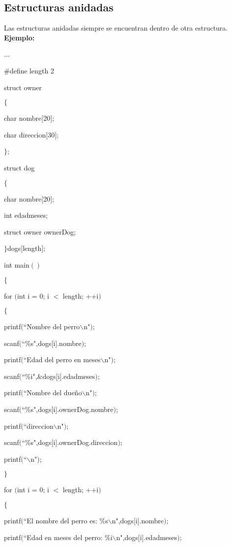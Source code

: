 \documentclass[]{article}
\begin{document}
	\subsection{Estructuras anidadas}
	Las estructuras anidadas siempre se encuentran dentro de otra estructura.\\
	
	\textbf{Ejemplo:\\}
	
	...
	
	\#define length 2
	
	struct owner
	
	$\lbrace$
	
	char nombre$[$20$]$;
	
	char direccion$[$30$]$;
	
	$\rbrace$;
	
	struct dog
	
	$\lbrace$
	
	char nombre$[$20$]$;
	
	int edadmeses;
	
	struct owner ownerDog;
	
	$\rbrace$dogs$[$length$]$;
	
	int main$()$
	
	$\lbrace$
	
	for $($int i = 0; i $<$ length; ++i$)$
	
	$\lbrace$
	
	printf$($``Nombre del perro$\backslash$n"$)$;
	
	scanf$($``\%s",dogs$[$i$]$.nombre$)$;
	
	printf$($``Edad del perro en meses$\backslash$n"$)$;
	
	scanf$($``\%i",\&dogs$[$i$]$.edadmeses$)$;
	
	printf$($``Nombre del dueño$\backslash$n"$)$;
	
	scanf$($``\%s",dogs$[$i$]$.ownerDog.nombre$)$;
	
	printf$($``direccion$\backslash$n"$)$;
	
	scanf$($``\%s",dogs$[$i$]$.ownerDog.direccion$)$;
	
	printf$($``$\backslash$n"$)$;
	
	$\rbrace$
	
	for $($int i = 0; i $<$ length; ++i$)$
	
	$\lbrace$
	
	printf$($``El nombre del perro es: \%s$\backslash$n",dogs$[$i$]$.nombre$)$;
	
	printf$($``Edad en meses del perro: \%i$\backslash$n",dogs$[$i$]$.edadmeses$)$;
	
\end{document}
